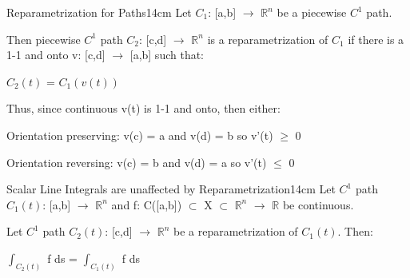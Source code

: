     \vspace{0.5cm}



    \begin{definition}{Reparametrization for Paths}{14cm}
        Let $C_1$: [a,b] $\rightarrow$ $\mathbb{R}^n$ be a piecewise $C^1$ path.

        Then piecewise $C^1$ path $C_2$: [c,d] $\rightarrow$ $\mathbb{R}^n$
        is a {\color{lblue} reparametrization} of $C_1$ if there is a
        1-1 and onto v: [c,d] $\rightarrow$ [a,b] such that:

        \hspace{0.5cm}
        $C_2(t)$ = $C_1(v(t))$

        Thus, since continuous v(t) is 1-1 and onto, then either:

        \hspace{0.5cm}
        {\color{lblue} Orientation preserving}:
        \hspace{0.5cm}
        v(c) = a
        and v(d) = b
        \hspace{0.5cm}
        so v'(t) $\geq$ 0
        
        \hspace{0.5cm}
        {\color{lblue} Orientation reversing}:
        \hspace{0.7cm}
        v(c) = b
        and v(d) = a
        \hspace{0.5cm}
        so v'(t) $\leq$ 0
    \end{definition}

    \newpage



    \begin{wtheorem}{Scalar Line Integrals are unaffected
    by Reparametrization}{14cm}
        Let $C^1$ path $C_1(t)$: [a,b] $\rightarrow$ $\mathbb{R}^n$
        and f: C([a,b]) $\subset$ X $\subset$ $\mathbb{R}^n$ $\rightarrow$
        $\mathbb{R}$ be continuous.

        Let $C^1$ path $C_2(t)$: [c,d] $\rightarrow$ $\mathbb{R}^n$
        be a reparametrization of $C_1(t)$. Then:

        \hspace{0.5cm}
        $\int_{C_2(t)}$ f ds = $\int_{C_1(t)}$ f ds
    \end{wtheorem}

